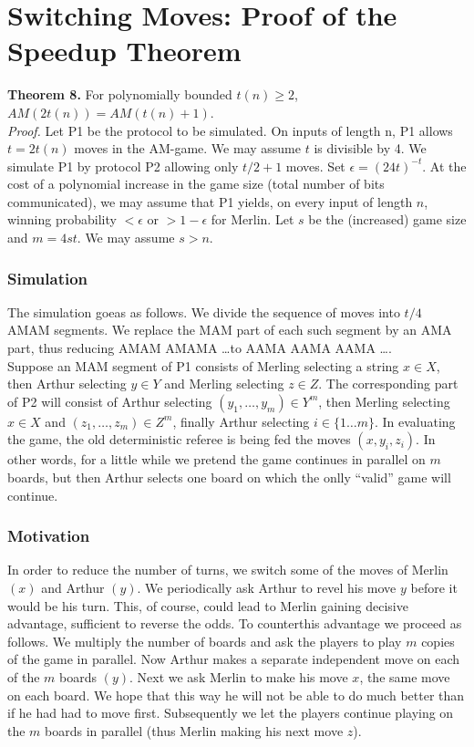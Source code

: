 \documentclass{beamer}
\begin{document}
\section{Switching Moves: Proof of the Speedup Theorem}

\begin{frame}
\textbf{Theorem 8.} For polynomially bounded $t(n) \geq 2$, $AM(2t(n)) = AM(t(n) + 1)$.\\
\textit{Proof.} Let P1 be the protocol to be simulated. On inputs of length n, P1 allows $t=2t(n)$ moves in the AM-game. We may assume $t$ is divisible by 4. We simulate P1 by protocol P2 allowing only $t/2 + 1$ moves. Set $\epsilon = (24t)^{-t}$. At the cost of a polynomial increase in the game size (total number of bits communicated), we may assume that P1 yields, on every input of length $n$, winning probability $< \epsilon$ or $> 1 - \epsilon$ for Merlin. Let $s$ be the (increased) game size and $m = 4st$. We may assume $s > n$.
\end{frame}

\begin{frame}
\frametitle{Simulation}
The simulation goeas as follows. We divide the sequence of moves into $t/4$ AMAM segments. We replace the MAM part of each such segment by an AMA part, thus reducing AMAM AMAMA \dots to AAMA AAMA AAMA \dots.\\
Suppose an MAM segment of P1 consists of Merling selecting a string $x \in X$, then Arthur selecting $y \in Y$ and Merling selecting $z \in Z$. The corresponding part of P2 will consist of Arthur selecting $(y_1,\dots,y_m)\in Y^m$, then Merling selecting $x\in X$ and $(z_1,\dots,z_m)\in Z^m$, finally Arthur selecting $i \in \{1\ldots m\}$. In evaluating the game, the old deterministic referee is being fed the moves $(x, y_i, z_i)$. In other words, for a little while we pretend the game continues in parallel on $m$ boards, but then Arthur selects one board on which the onlly ``valid'' game will continue.
\end{frame}

\begin{frame}
\frametitle{Motivation}
In order to reduce the number of turns, we switch some of the moves of Merlin $(x)$ and Arthur $(y)$. We periodically ask Arthur to revel his move $y$ before it would be his turn. This, of course, could lead to Merlin gaining decisive advantage, sufficient to reverse the odds. To counterthis advantage we proceed as follows. We multiply the number of boards and ask the players to play $m$ copies of the game in parallel. Now Arthur makes a separate independent move on each of the $m$ boards $(y)$. Next we ask Merlin to make his move $x$, the same move on each board. We hope that this way he will not be able to do much better than if he had had to move first. Subsequently we let the players continue playing on the $m$ boards in parallel (thus Merlin making his next move $z$).
\end{frame}
\end{document}
